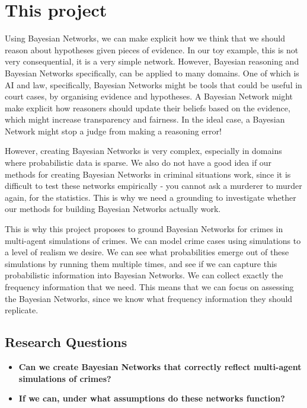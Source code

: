 \section{This project}
Using Bayesian Networks, we can make explicit how we think that we should reason about hypotheses given pieces of evidence. In our toy example, this is not very consequential, it is a very simple network. However, Bayesian reasoning and Bayesian Networks specifically, can be applied to many domains. One of which is AI and law, specifically, Bayesian Networks might be tools that could be useful in court cases, by organising evidence and hypotheses. A Bayesian Network might make explicit how reasoners should update their beliefs based on the evidence, which might increase transparency and fairness. In the ideal case, a Bayesian Network might stop a judge from making a reasoning error!

However, creating Bayesian Networks is very complex, especially in domains where probabilistic data is sparse. We also do not have a good idea if our methods for creating Bayesian Networks in criminal situations work, since it is difficult to test these networks empirically - you cannot ask a murderer to murder again, for the statistics. This is why we need a grounding to investigate whether our methods for building Bayesian Networks actually work.

This is why this project proposes to ground Bayesian Networks for crimes in multi-agent simulations of crimes. We can model crime cases using simulations to a level of realism we desire. We can see what probabilities emerge out of these simulations by running them multiple times, and see if we can capture this probabilistic information into Bayesian Networks. We can collect exactly the frequency information that we need. This means that we can focus on assessing the Bayesian Networks, since we know what frequency information they should replicate.

\subsection{Research Questions}
\begin{itemize}
\item \textbf{Can we create Bayesian Networks that correctly reflect multi-agent simulations of crimes?}
\item \textbf{If we can, under what assumptions do these networks function?}
\end{itemize}



